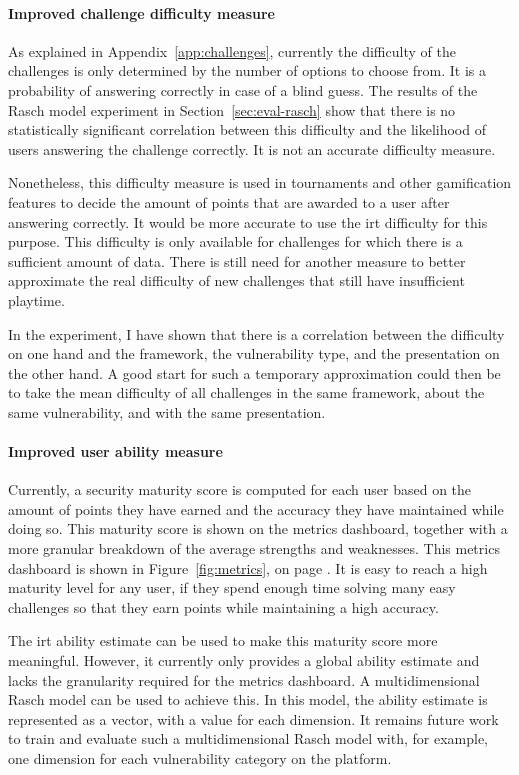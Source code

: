 \paragraph{Improved challenge difficulty measure}
As explained in Appendix~\ref{app:challenges}, currently the difficulty of the challenges is only determined by the number of options to choose from.
It is a probability of answering correctly in case of a blind guess.
The results of the Rasch model experiment in Section~\ref{sec:eval-rasch} show that there is no statistically significant correlation between this difficulty and the likelihood of users answering the challenge correctly.
It is not an accurate difficulty measure.

Nonetheless, this difficulty measure is used in tournaments and other gamification features to decide the amount of points that are awarded to a user after answering correctly.
It would be more accurate to use the \gls{irt} difficulty for this purpose.
This difficulty is only available for challenges for which there is a sufficient amount of data.
There is still need for another measure to better approximate the real difficulty of new challenges that still have insufficient playtime.

In the experiment, I have shown that there is a correlation between the difficulty on one hand and the framework, the vulnerability type, and the presentation on the other hand.
A good start for such a temporary approximation could then be to take the mean difficulty of all challenges in the same framework, about the same vulnerability, and with the same presentation.

\paragraph{Improved user ability measure}
Currently, a security maturity score is computed for each user based on the amount of points they have earned and the accuracy they have maintained while doing so.
This maturity score is shown on the metrics dashboard, together with a more granular breakdown of the average strengths and weaknesses.
This metrics dashboard is shown in Figure~\ref{fig:metrics}, on page \pageref{fig:metrics}.
It is easy to reach a high maturity level for any user, if they spend enough time solving many easy challenges so that they earn points while maintaining a high accuracy.

The \gls{irt} ability estimate can be used to make this maturity score more meaningful.
However, it currently only provides a global ability estimate and lacks the granularity required for the metrics dashboard.
A multidimensional Rasch model can be used to achieve this.
In this model, the ability estimate is represented as a vector, with a value for each dimension.
It remains future work to train and evaluate such a multidimensional Rasch model with, for example, one dimension for each vulnerability category on the platform.

